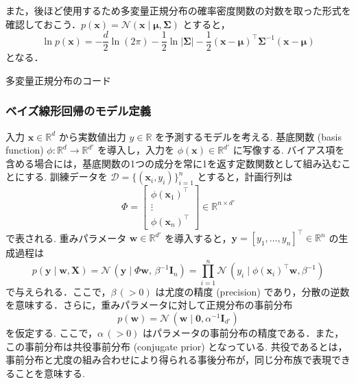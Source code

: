 \documentclass[titlepage]{ltjsbook}
\begin{document}
また，後ほど使用するため多変量正規分布の確率密度関数の対数を取った形式を確認しておこう．$p(\mathbf{x})=\mathcal{N}(\mathbf{x} \mid \boldsymbol{\mu}, \boldsymbol{\Sigma}) $ とすると，
\begin{equation}
\ln p(\mathbf{x}) = -\frac{d}{2} \ln (2\pi) - \frac{1}{2} \ln \lvert\boldsymbol{\Sigma}\rvert - \frac{1}{2}(\mathbf{x} - \boldsymbol{\mu})^\top \boldsymbol{\Sigma}^{-1} (\mathbf{x} - \boldsymbol{\mu})
\end{equation}
となる．

\begin{tcolorbox}
多変量正規分布のコード
\end{tcolorbox}

\subsubsection{ベイズ線形回帰のモデル定義}
入力 $\mathbf{x} \in \mathbb{R}^d$ から実数値出力 $y \in \mathbb{R}$ を予測するモデルを考える. 基底関数 (basis function) $\phi:\mathbb{R}^d \to \mathbb{R}^{d'}$ を導入し，入力を $\phi(\mathbf{x}) \in \mathbb{R}^{d'}$ に写像する. バイアス項を含める場合には，基底関数の1つの成分を常に1を返す定数関数として組み込むことにする. 訓練データを $\mathcal{D}=\{(\mathbf{x}_i, y_i)\}_{i=1}^n$ とすると，計画行列は
\begin{equation}
\Phi = 
\begin{bmatrix}
\phi(\mathbf{x}_1)^\top \\
\vdots \\
\phi(\mathbf{x}_n)^\top
\end{bmatrix}
\in \mathbb{R}^{n\times d'}
\end{equation}
で表される. 重みパラメータ $\mathbf{w}\in\mathbb{R}^{d'}$ を導入すると，$\mathbf{y}=[y_1,\dots,y_n]^\top \in \mathbb{R}^n$ の生成過程は
\begin{equation}
p(\mathbf{y}\mid \mathbf{w},\mathbf{X})
=\mathcal{N}\,\left(\mathbf{y}\mid \Phi \mathbf{w},\,\beta^{-1}\mathbf{I}_n\right)
= \prod_{i=1}^n \mathcal{N}\,\left(y_i\mid \phi(\mathbf{x}_i)^\top\mathbf{w} , \beta^{-1}\right)
\end{equation}
で与えられる．ここで，$\beta\,(>0)$ は尤度の精度 (precision) であり，分散の逆数を意味する．さらに，重みパラメータに対して正規分布の事前分布
\begin{equation}
p(\mathbf{w})=\mathcal{N}\,\left(\mathbf{w}\mid \mathbf{0},\alpha^{-1} \mathbf{I}_{d'}\right)
\end{equation}
を仮定する. ここで，$\alpha\,(>0)$ はパラメータの事前分布の精度である．また，この事前分布は共役事前分布 (conjugate prior) となっている. 共役であるとは，事前分布と尤度の組み合わせにより得られる事後分布が，同じ分布族で表現できることを意味する. 
\end{document}
